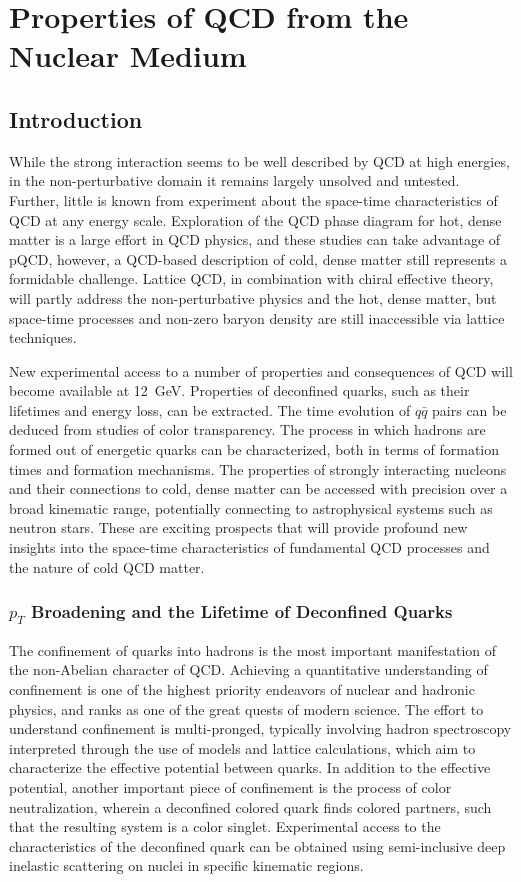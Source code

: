 \chapter{Properties of QCD from the Nuclear Medium}

\section{Introduction}

While the strong interaction seems to be well described by QCD at high
energies, in the non-perturbative domain it remains largely unsolved
and untested. Further, little is known from experiment about the
space-time characteristics of QCD at any energy scale. Exploration of
the QCD phase diagram for hot, dense matter is a large effort in QCD
physics, and these studies can take advantage of pQCD, however, a
QCD-based description of cold, dense matter still represents a 
formidable challenge. Lattice QCD, in combination with chiral effective 
theory, will partly address the non-perturbative physics and the hot, 
dense matter, but space-time processes and non-zero baryon density are 
still inaccessible via lattice techniques.

New experimental access to a number of properties and consequences of
QCD will become available at 12~GeV. Properties of deconfined quarks,
such as their lifetimes and energy loss, can be extracted. The time
evolution of $q\bar{q}$ pairs can be deduced from studies of color
transparency. The process in which hadrons are formed out of energetic 
quarks can be characterized, both in terms of formation times and 
formation mechanisms. The properties of strongly interacting nucleons 
and their connections to cold, dense matter can be accessed with 
precision over a broad kinematic range, potentially connecting to 
astrophysical systems such as neutron stars. These are exciting 
prospects that will provide profound new insights into the space-time 
characteristics of fundamental QCD processes and the nature of cold 
QCD matter.

\boldmath
\subsection{$p_T$ Broadening and the Lifetime of Deconfined Quarks}
\unboldmath

The confinement of quarks into hadrons is the most important
manifestation of the non-Abelian character of QCD. Achieving a
quantitative understanding of confinement is one of the highest
priority endeavors of nuclear and hadronic physics, and ranks as 
one of the great quests of modern science. The effort to understand
confinement is multi-pronged, typically involving hadron spectroscopy
interpreted through the use of models and lattice calculations, which
aim to characterize the effective potential between quarks. In
addition to the effective potential, another important piece of
confinement is the process of color neutralization, wherein a
deconfined colored quark finds colored partners, such that the
resulting system is a color singlet. Experimental access to the
characteristics of the deconfined quark can be obtained using
semi-inclusive deep inelastic scattering on nuclei in specific
kinematic regions.

